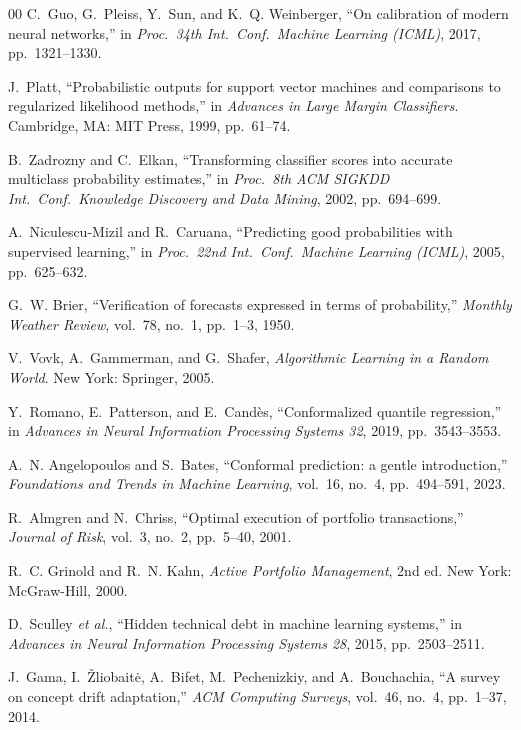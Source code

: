 \documentclass[conference]{IEEEtran}
\begin{document}
\begin{thebibliography}{00}
 C.~Guo, G.~Pleiss, Y.~Sun, and K.~Q. Weinberger, ``On calibration
of modern neural networks,'' in \emph{Proc.\ 34th Int.\ Conf.\ Machine Learning
(ICML)}, 2017, pp.~1321--1330.

 J.~Platt, ``Probabilistic outputs for support vector machines
and comparisons to regularized likelihood methods,'' in \emph{Advances in Large
Margin Classifiers}. Cambridge, MA: MIT Press, 1999, pp.~61--74.

 B.~Zadrozny and C.~Elkan, ``Transforming classifier scores
into accurate multiclass probability estimates,'' in \emph{Proc.\ 8th ACM SIGKDD
Int.\ Conf.\ Knowledge Discovery and Data Mining}, 2002, pp.~694--699.

 A.~Niculescu-Mizil and R.~Caruana, ``Predicting good
probabilities with supervised learning,'' in \emph{Proc.\ 22nd Int.\ Conf.\ Machine
Learning (ICML)}, 2005, pp.~625--632.

 G.~W. Brier, ``Verification of forecasts expressed in terms of
probability,'' \emph{Monthly Weather Review}, vol.~78, no.~1, pp.~1--3, 1950.

 V.~Vovk, A.~Gammerman, and G.~Shafer, \emph{Algorithmic Learning
in a Random World}. New York: Springer, 2005.

 Y.~Romano, E.~Patterson, and E.~Cand\`es, ``Conformalized
quantile regression,'' in \emph{Advances in Neural Information Processing Systems
32}, 2019, pp.~3543--3553.

 A.~N. Angelopoulos and S.~Bates, ``Conformal prediction:
a gentle introduction,'' \emph{Foundations and Trends in Machine Learning}, vol.~16,
no.~4, pp.~494--591, 2023.

 R.~Almgren and N.~Chriss, ``Optimal execution of portfolio
transactions,'' \emph{Journal of Risk}, vol.~3, no.~2, pp.~5--40, 2001.

 R.~C. Grinold and R.~N. Kahn, \emph{Active Portfolio
Management}, 2nd ed. New York: McGraw-Hill, 2000.

 D.~Sculley \emph{et al.}, ``Hidden technical debt in machine
learning systems,'' in \emph{Advances in Neural Information Processing Systems 28},
2015, pp.~2503--2511.

 J.~Gama, I.~\v{Z}liobait\.e, A.~Bifet, M.~Pechenizkiy, and
A.~Bouchachia, ``A survey on concept drift adaptation,'' \emph{ACM Computing
Surveys}, vol.~46, no.~4, pp.~1--37, 2014.


\end{thebibliography}
\end{document}
